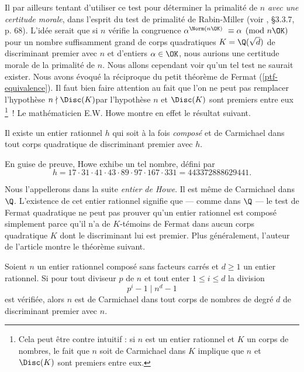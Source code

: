 Il par ailleurs tentant d'utiliser ce test pour déterminer la primalité de $n$ \emph{avec une certitude morale}, dans l'esprit du  test de primalité de Rabin-Miller (voir \cite{Demazure}, §3.3.7, p. 68). L'idée serait que si $n$ vérifie la congruence $\alpha^{\Norm(n\OK)} \equiv \alpha \pmod{n\OK}$ pour un nombre \og suffisamment grand \fg{} de corps quadratiques $K = \Q(\sqrt{d})$ de discriminant premier avec $n$ et d'entiers $\alpha \in \OK$, nous aurions une certitude morale de la primalité de $n$. Nous allons cependant voir qu'un tel test ne saurait exister. Nous avons évoqué la réciproque du petit théorème de Fermat (\ref{ptf-equivalence}). Il faut bien faire attention au fait que l'on ne peut pas remplacer l'hypothèse \og $n \nmid \Disc(K)$\fg par l'hypothèse \og $n$ et $\Disc(K)$ sont premiers entre eux \fg \footnote{Cela peut être contre intuitif : si $n$ est un entier rationnel et $K$ un corps de nombres, le fait que $n$ soit de Carmichael dans $K$ implique que $n$ et $\Disc(K)$ sont premiers entre eux.}~! Le mathématicien E.W. Howe montre en effet le résultat suivant.

\begin{theoreme}[Howe, 2000]
	Il existe un entier rationnel $h$ qui soit à la fois \emph{composé} et de Carmichael dans tout corps quadratique de discriminant premier avec $h$.
\end{theoreme}

En guise de preuve, Howe exhibe un tel nombre, défini par
	\begin{equation}\label{Howe}
		h = 17 \cdot 31 \cdot 41 \cdot 43 \cdot 89 \cdot 97 \cdot 167 \cdot 331 = 443372888629441.
	\end{equation}

Nous l'appellerons dans la suite \emph{entier de Howe}. Il est même de Carmichael dans $\Q$. L'existence de cet entier rationnel signifie que — comme dans $\Q$ — le test de Fermat quadratique ne peut pas prouver qu'un entier rationnel est composé simplement parce qu'il n'a de $K$-témoins de Fermat dans aucun corps quadratique $K$ dont le discriminant lui est premier. Plus généralement, l'auteur de l'article montre le théorème suivant.

\begin{theoreme}\label{theoreme-2.7}
	Soient $n$ un entier rationnel composé sans facteurs carrés et $d\geq 1$ un entier rationnel. Si pour tout diviseur $p$ de $n$ et tout enter $1\leq i \leq d$ la division $$p^i - 1\mid n^d - 1$$ est vérifiée, alors $n$ est de Carmichael dans tout corps de nombres de degré $d$ de discriminant premier avec $n$.
\end{theoreme}

